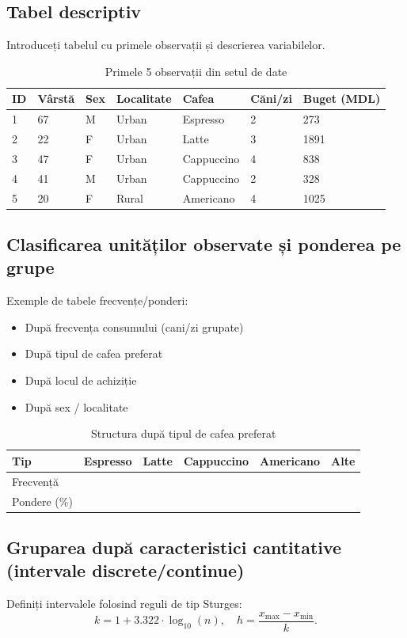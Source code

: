 \documentclass[12pt,a4paper]{report}
\begin{document}
\subsection{Tabel descriptiv}
Introduceți tabelul cu primele observații și descrierea variabilelor.

\begin{table}[H]
\centering
\caption{Primele 5 observații din setul de date}
\label{tab:primele5}
\begin{tabular}{@{}lllllll@{}}
\toprule
ID & Vârstă & Sex & Localitate & Cafea & Căni/zi & Buget (MDL) \\
\midrule
1 & 67 & M & Urban & Espresso & 2 & 273 \\
2 & 22 & F & Urban & Latte & 3 & 1891 \\
3 & 47 & F & Urban & Cappuccino & 4 & 838 \\
4 & 41 & M & Urban & Cappuccino & 2 & 328 \\
5 & 20 & F & Rural & Americano & 4 & 1025 \\
\bottomrule
\end{tabular}
\end{table}

\subsection{Clasificarea unităților observate și ponderea pe grupe}
Exemple de tabele frecvențe/ponderi:
\begin{itemize}[leftmargin=1.2cm]
  \item După frecvența consumului (cani/zi grupate)
  \item După tipul de cafea preferat
  \item După locul de achiziție
  \item După sex / localitate
\end{itemize}

\begin{table}[H]
\centering
\caption{Structura după tipul de cafea preferat}
\label{tab:tip_cafea}
\begin{tabular}{@{}llllll@{}}
\toprule
Tip & Espresso & Latte & Cappuccino & Americano & Alte \\
\midrule
Frecvență &  &  &  &  &  \\
Pondere (\%) &  &  &  &  &  \\
\bottomrule
\end{tabular}
\end{table}

\subsection{Gruparea după caracteristici cantitative (intervale discrete/continue)}
Definiți intervalele folosind reguli de tip Sturges: 
$$
k = 1 + 3.322 \cdot \log_{10}(n), \quad h = \frac{x_{\max} - x_{\min}}{k}.
$$
\end{document}
